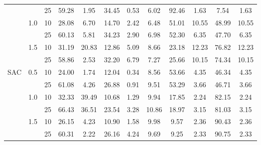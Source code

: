 \documentclass[manuscript,screen,review]{acmart}
\begin{document}
\begin{table}[h]
{\begin{tabular}{cccccccccccc}
    &     & 25 &  59.28 &   1.95 &   34.45 &  0.53 &           6.02 &    92.46 &   1.63 &     7.54 &   1.63 \\
    & 1.0 & 10 &  28.08 &   6.70 &   14.70 &  2.42 &           6.48 &    51.01 &  10.55 &    48.99 &  10.55 \\
    &     & 25 &  60.13 &   5.81 &   34.23 &  2.90 &           6.98 &    52.30 &   6.35 &    47.70 &   6.35 \\
    & 1.5 & 10 &  31.19 &  20.83 &   12.86 &  5.09 &           8.66 &    23.18 &  12.23 &    76.82 &  12.23 \\
    &     & 25 &  58.86 &   2.53 &   32.20 &  6.79 &           7.27 &    25.66 &  10.15 &    74.34 &  10.15 \\
SAC & 0.5 & 10 &  24.00 &   1.74 &   12.04 &  0.34 &           8.56 &    53.66 &   4.35 &    46.34 &   4.35 \\
    &     & 25 &  61.08 &   4.26 &   26.88 &  0.91 &           9.51 &    53.29 &   3.66 &    46.71 &   3.66 \\
    & 1.0 & 10 &  32.33 &  39.49 &   10.68 &  1.29 &           9.94 &    17.85 &   2.24 &    82.15 &   2.24 \\
    &     & 25 &  66.43 &  36.51 &   23.54 &  3.28 &          10.86 &    18.97 &   3.15 &    81.03 &   3.15 \\
    & 1.5 & 10 &  26.15 &   4.23 &   10.90 &  1.58 &           9.98 &     9.57 &   2.36 &    90.43 &   2.36 \\
    &     & 25 &  60.31 &   2.22 &   26.16 &  4.24 &           9.69 &     9.25 &   2.33 &    90.75 &   2.33 \\
\end{tabular}}
\label{tab:additional}
\end{table}
\end{document}
